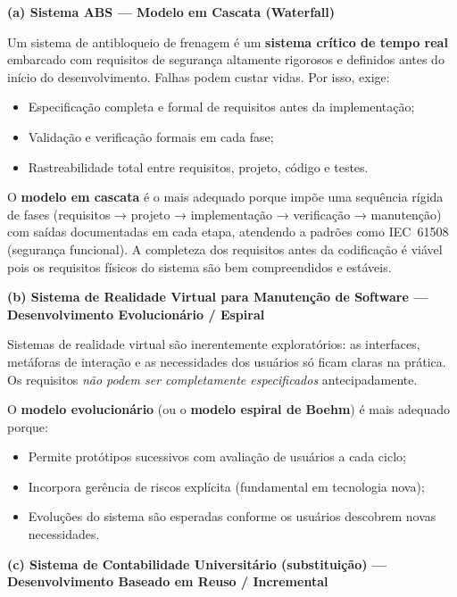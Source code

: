 \documentclass[12pt,a4paper]{article}
\begin{document}
\begin{resposta}

\textbf{(a) Sistema ABS — Modelo em Cascata (Waterfall)}

Um sistema de antibloqueio de frenagem é um \textbf{sistema crítico de tempo real}
embarcado com requisitos de segurança altamente rigorosos e definidos antes do
início do desenvolvimento. Falhas podem custar vidas. Por isso, exige:
\begin{itemize}[nosep]
  \item Especificação completa e formal de requisitos antes da implementação;
  \item Validação e verificação formais em cada fase;
  \item Rastreabilidade total entre requisitos, projeto, código e testes.
\end{itemize}

O \textbf{modelo em cascata} é o mais adequado porque impõe uma sequência rígida
de fases (requisitos → projeto → implementação → verificação → manutenção) com
saídas documentadas em cada etapa, atendendo a padrões como IEC~61508 (segurança
funcional). A completeza dos requisitos antes da codificação é viável pois os
requisitos físicos do sistema são bem compreendidos e estáveis.

\vspace{8pt}
\textbf{(b) Sistema de Realidade Virtual para Manutenção de Software — Desenvolvimento Evolucionário / Espiral}

Sistemas de realidade virtual são inerentemente exploratórios: as interfaces,
metáforas de interação e as necessidades dos usuários só ficam claras na prática.
Os requisitos \emph{não podem ser completamente especificados} antecipadamente.

O \textbf{modelo evolucionário} (ou o \textbf{modelo espiral de Boehm}) é mais
adequado porque:
\begin{itemize}[nosep]
  \item Permite protótipos sucessivos com avaliação de usuários a cada ciclo;
  \item Incorpora gerência de riscos explícita (fundamental em tecnologia nova);
  \item Evoluções do sistema são esperadas conforme os usuários descobrem novas necessidades.
\end{itemize}

\vspace{8pt}
\textbf{(c) Sistema de Contabilidade Universitário (substituição) — Desenvolvimento Baseado em Reuso / Incremental}


\end{resposta}
\end{document}
